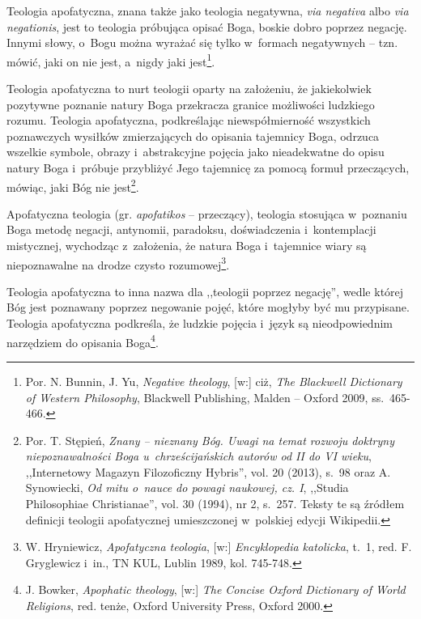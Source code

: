 \begin{defin}\label{int-deftn-fi}
Teologia apofatyczna, znana także jako teologia negatywna, \textit{via negativa} albo \textit{via negationis}, jest to teologia próbująca opisać Boga, boskie dobro poprzez negację. Innymi słowy, o~Bogu można wyrażać się tylko w~formach negatywnych -- tzn. mówić, jaki on nie jest, a~nigdy jaki jest\footnote{Por. N. Bunnin, J. Yu, \textit{Negative theology}, [w:] ciż, \textit{The Blackwell Dictionary of Western Philosophy}, Blackwell Publishing, Malden -- Oxford 2009, ss.~465-466.}.
\end{defin}
\begin{defin}
Teologia apofatyczna to nurt teologii oparty na założeniu, że jakiekolwiek pozytywne poznanie natury Boga przekracza granice możliwości ludzkiego rozumu. Teologia apofatyczna, podkreślając niewspółmierność wszystkich poznawczych wysiłków zmierzających do opisania tajemnicy Boga, odrzuca wszelkie symbole, obrazy i~abstrakcyjne pojęcia jako nieadekwatne do opisu natury Boga i~próbuje przybliżyć Jego tajemnicę za pomocą formuł przeczących, mówiąc, jaki Bóg nie jest\footnote{Por. T. Stępień, \textit{Znany -- nieznany Bóg. Uwagi na temat rozwoju doktryny niepoznawalności Boga u~chrześcijańskich autorów od II do VI wieku}, ,,Internetowy Magazyn Filozoficzny Hybris'', vol. 20 (2013), s.~98 oraz A. Synowiecki, \textit{Od mitu o~nauce do powagi naukowej, cz. I}, ,,Studia Philosophiae Christianae'', vol. 30 (1994), nr 2, s.~257. Teksty te są źródłem definicji teologii apofatycznej umieszczonej w~polskiej edycji Wikipedii.}.
\end{defin}
\begin{defin}
Apofatyczna teologia (gr. \textit{apofatikos} -- przeczący), teologia stosująca w~poznaniu Boga metodę negacji, antynomii, paradoksu, doświadczenia i~kontemplacji mistycznej, wychodząc z~założenia, że natura Boga i~tajemnice wiary są niepoznawalne na drodze czysto rozumowej\footnote{W. Hryniewicz, \textit{Apofatyczna teologia}, [w:] \textit{Encyklopedia katolicka}, t.~1, red. F. Gryglewicz i~in., TN KUL, Lublin 1989, kol. 745-748.}.
\end{defin}
\begin{defin}
Teologia apofatyczna to inna nazwa dla ,,teologii poprzez negację'', wedle której Bóg jest poznawany poprzez negowanie pojęć, które mogłyby być mu przypisane. Teologia apofatyczna podkreśla, że ludzkie pojęcia i~język są nieodpowiednim narzędziem do opisania Boga\footnote{J. Bowker, \textit{Apophatic theology}, [w:] \textit{The Concise Oxford Dictionary of World Religions}, red. tenże, Oxford University Press, Oxford 2000.}.
\end{defin}
